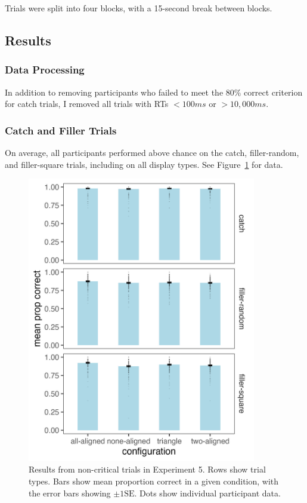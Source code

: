 Trials were split into four blocks, with a 15-second break between blocks.

\subsection{Results}

\subsubsection{Data Processing}
In addition to removing participants who failed to meet the $80\%$ correct criterion for catch trials, I removed all trials with RTs $<100ms$ or $>10,000ms$. 

\subsubsection{Catch and Filler Trials}
On average, all participants performed above chance on the catch, filler-random, and filler-square trials, including on all display types. See Figure~\ref{fig:comparability_non_crit_mean_prop_correct} for data.

\begin{figure}
   \includegraphics[width=100mm]{figures/comparability_non_crit_mean_prop_correct.jpeg}
   \caption{Results from non-critical trials in Experiment 5. Rows show trial types. Bars show mean proportion correct in a given condition, with the error bars showing $\pm1\text{SE}$. Dots show individual participant data.}
   \label{fig:comparability_non_crit_mean_prop_correct}
\end{figure}

